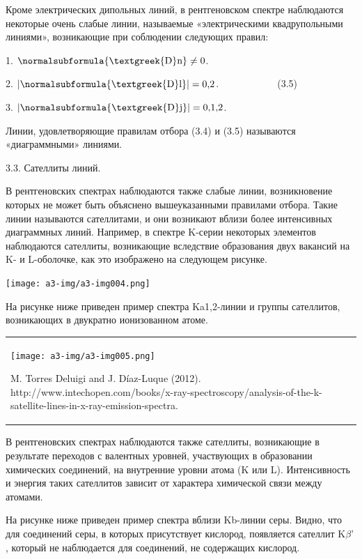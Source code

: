 \documentclass[a4paper,14pt, openany, twoside, draft]{extbook} %
\begin{document}
Кроме электрических дипольных линий, в рентгеновском спектре наблюдаются некоторые очень слабые линии, называемые «электрическими квадрупольными линиями», возникающие при соблюдении следующих правил:

1.   $\normalsubformula{\text{\textgreek{D}n}}\neq 0$.\ \ \ \ \ \ \ \ \ \

2.   $|\normalsubformula{\text{\textgreek{D}l}}|=\text{0,2}$.\ \ \ \ \ \ \ \ \ \ \ \ (3.5)

3.   $|\normalsubformula{\text{\textgreek{D}j}}|=\text{0,1,2}$.\ \ \ \ \ \ \ \

Линии, удовлетворяющие правилам отбора (3.4) и (3.5) называются «диаграммными» линиями.

3.3. Сателлиты линий.

В рентгеновских спектрах наблюдаются также слабые линии, возникновение которых не может быть объяснено вышеуказанными правилами отбора. Такие линии называются сателлитами, и они возникают вблизи более интенсивных диаграммных линий. Например, в спектре K{}-серии некоторых элементов наблюдаются сателлиты, возникающие вследствие образования двух вакансий на K{}- и L{}-оболочке, как это изображено на следующем рисунке.

 \texttt{[image: a3-img/a3-img004.png]}

На рисунке ниже приведен пример спектра K\textgreek{a}1,2{}-линии и группы сателлитов, возникающих в двукратно ионизованном атоме.

\begin{flushleft}
\tablefirsthead{}
\tablehead{}
\tabletail{}
\tablelasttail{}
\begin{supertabular}{m{17.179998cm}}
{  \texttt{[image: a3-img/a3-img005.png]} }

{ M. Torres Deluigi and J. Díaz-Luque (2012). http://www.intechopen.com/books/x{}-ray{}-spectroscopy/analysis{}-of{}-the{}-k{}-satellite{}-lines{}-in{}-x{}-ray{}-emission{}-spectra.}

\\
\end{supertabular}
\end{flushleft}
В рентгеновских спектрах наблюдаются также сателлиты, возникающие в результате переходов с валентных уровней, участвующих в образовании химических соединений, на внутренние уровни атома (K или L). Интенсивность и энергия таких сателлитов зависит от характера химической связи между атомами.

На рисунке ниже приведен пример спектра вблизи K\textgreek{b}{}-линии серы. Видно, что для соединений серы, в которых присутствует кислород, появляется сателлит K${\beta}$’ , который не наблюдается для соединений, не содержащих кислород.
\end{document}
